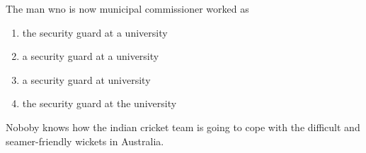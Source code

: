                                            
\iffalse
    \title{Assignment}
    \author{EE24BTECH11028}
    \section{ee}
    \chapter{2016}
  \fi
    \item The man wno is now municipal commissioner worked as\\
    \begin{enumerate}
        \item the security guard at a university\\
        \item a security guard at a university\\
         \item a security guard at  university\\
          \item the security guard at the university   
    \end{enumerate}
    \item  Noboby knows how the indian cricket team is going to cope with the difficult and seamer-friendly wickets in Australia.\\
    

